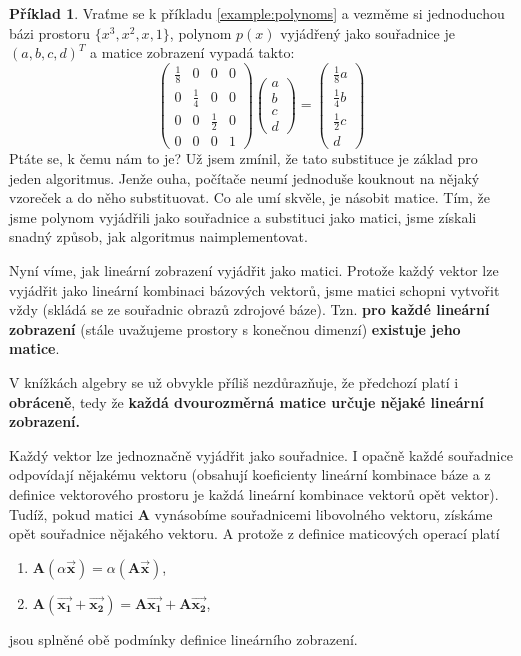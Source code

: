 \documentclass[a5paper,12pt]{amsbook}
\theoremstyle{definition}
\newtheorem{example}{Příklad}[chapter]
\newcommand{\myscalar}[1]{#1}
\newcommand{\mycoord}[1]{\overrightarrow{\mathbf{#1}}}
\newcommand{\mymatrix}[1]{\mathbf{#1}}
\begin{document}
\begin{example}Vraťme se k příkladu \ref{example:polynoms} a vezměme si jednoduchou bázi prostoru
$\{x^3, x^2, x, 1\}$, polynom $p(x)$ vyjádřený jako souřadnice je $(a, b, c, d)^T$ a matice zobrazení
vypadá takto:
\begin{equation*}
\left(\begin{array}{cccc}
\frac{1}{8} & 0 & 0 & 0\\
0 & \frac{1}{4} & 0 & 0\\
0 & 0 & \frac{1}{2} & 0\\
0 & 0 & 0 & 1
\end{array}\right)\left(\begin{array}{c}
a\\
b\\
c\\
d
\end{array}\right)=\left(\begin{array}{c}
\frac{1}{8}a\\
\frac{1}{4}b\\
\frac{1}{2}c\\
d
\end{array}\right)
\end{equation*}
Ptáte se, k čemu nám to je? Už jsem zmínil, že tato substituce je základ pro jeden
algoritmus. Jenže ouha, počítače neumí jednoduše kouknout na nějaký vzoreček a do
něho substituovat. Co ale umí skvěle, je násobit matice. Tím, že jsme polynom vyjádřili
jako souřadnice a substituci jako matici, jsme získali snadný způsob, jak algoritmus
naimplementovat.
\end{example}

Nyní víme, jak lineární zobrazení vyjádřit jako matici. Protože každý vektor lze vyjádřit
jako lineární kombinaci bázových vektorů, jsme matici schopni vytvořit vždy (skládá se ze
souřadnic obrazů zdrojové báze). Tzn. \textbf{pro každé lineární zobrazení} (stále uvažujeme
prostory s konečnou dimenzí) \textbf{existuje jeho matice}.

V knížkách algebry se už obvykle příliš nezdůrazňuje, že předchozí platí i \textbf{obráceně}, tedy 
že \textbf{každá dvourozměrná matice určuje nějaké lineární zobrazení.}

Každý vektor lze jednoznačně vyjádřit jako souřadnice. I opačně každé souřadnice odpovídají nějakému
vektoru (obsahují koeficienty lineární kombinace báze a z definice vektorového prostoru je každá
lineární kombinace vektorů opět vektor). Tudíž, pokud matici $\mymatrix{A}$ vynásobíme souřadnicemi
libovolného vektoru, získáme opět souřadnice nějakého vektoru. A protože z definice maticových
operací platí
\begin{enumerate}
  \item$
      \mymatrix{A}\left(\myscalar{\alpha}\mycoord{x}\right)=
          \myscalar{\alpha}\left(\mymatrix{A}\mycoord{x}\right)$,
  \item$
      \mymatrix{A}\left(\mycoord{x_1}+\mycoord{x_2}\right)=
          \mymatrix{A}\mycoord{x_1}+\mymatrix{A}\mycoord{x_2}$,
\end{enumerate}
jsou splněné obě podmínky definice lineárního zobrazení.
\end{document}
